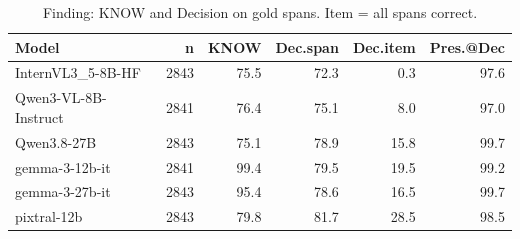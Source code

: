 \begin{table}[t]\centering\small
\caption{Finding: KNOW and Decision on gold spans. Item = all spans correct.}
\label{tab:news-decision}
\begin{tabular}{l r r r r r}\toprule
Model & n & KNOW & Dec.span & Dec.item & Pres.@Dec \\
\midrule
InternVL3_5-8B-HF & 2843 & 75.5 & 72.3 & 0.3 & 97.6 \\
Qwen3-VL-8B-Instruct & 2841 & 76.4 & 75.1 & 8.0 & 97.0 \\
Qwen3.8-27B & 2843 & 75.1 & 78.9 & 15.8 & 99.7 \\
gemma-3-12b-it & 2841 & 99.4 & 79.5 & 19.5 & 99.2 \\
gemma-3-27b-it & 2843 & 95.4 & 78.6 & 16.5 & 99.7 \\
pixtral-12b & 2843 & 79.8 & 81.7 & 28.5 & 98.5 \\
\bottomrule\end{tabular}\end{table}
